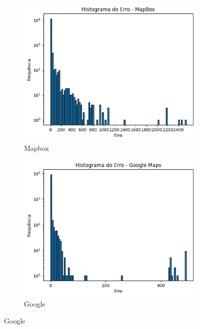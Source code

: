 \begin{figure}[ht]
  \centering
  \begin{subfigure}[b]{0.45\textwidth}
    \includegraphics[width=\textwidth]{Figuras/histMapboxSP.png}
    \caption{Mapbox}
    \label{fig:histmapbox}
  \end{subfigure}
  \hfill
  \begin{subfigure}[b]{0.45\textwidth}
    \includegraphics[width=\textwidth]{Figuras/histGoogleSP.png}
    \caption{Google}
    \label{fig:histgoogle}
  \end{subfigure}


\end{figure}
